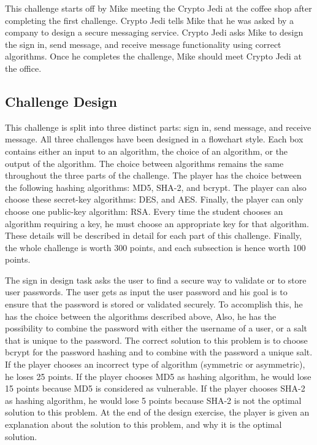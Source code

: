 \documentclass{l4proj}
\begin{document}
This challenge starts off by Mike meeting the Crypto Jedi at the coffee shop after completing the first challenge.
Crypto Jedi tells Mike that he was asked by a company to design a secure messaging service. 
Crypto Jedi asks Mike to design the sign in, send message, and receive message functionality
using correct algorithms. Once he completes the challenge, Mike should meet Crypto Jedi at the office.

\subsection{Challenge Design}

This challenge is split into three distinct parts: sign in, send message, and receive message.
All three challenges have been designed in a flowchart style. 
Each box contains either an input to an algorithm, the choice of an algorithm, 
or the output of the algorithm. 
The choice between algorithms remains the same throughout the three parts of the challenge.
The player has the choice between the following hashing algorithms: MD5, SHA-2, and bcrypt.
The player can also choose these secret-key algorithms: DES, and AES.
Finally, the player can only choose one public-key algorithm: RSA.
Every time the student chooses an algorithm requiring a key, 
he must choose an appropriate key for that algorithm. 
These details will be described in detail for each part of this challenge.
Finally, the whole challenge is worth 300 points, and each subsection is hence worth 100 points.

The sign in design task asks the user to find a secure way to validate or to store user passwords.
The user gets as input the user password 
and his goal is to ensure that the password is stored or validated securely.
To accomplish this, he has the choice between the algorithms described above, 
Also, he has the possibility to combine the password with either the username of a user,
or a salt that is unique to the password.
The correct solution to this problem is to choose bcrypt for the password hashing and
to combine with the password a unique salt.
If the player chooses an incorrect type of algorithm (symmetric or asymmetric), he loses 25 points.
If the player chooses MD5 as hashing algorithm, he would lose 15 points because MD5 is considered
as vulnerable. If the player chooses SHA-2 as hashing algorithm, he would lose 5 points because 
SHA-2 is not the optimal solution to this problem. 
At the end of the design exercise, the player is given an explanation about the solution to this problem, 
and why it is the optimal solution.
\end{document}
